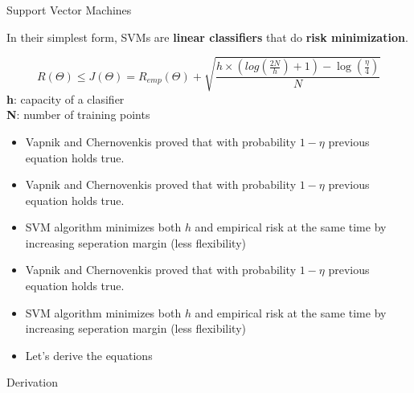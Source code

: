 \documentclass[12pt,fleqn]{article}\usepackage{../common}
\begin{document}
Support Vector Machines

In their simplest form, SVMs are \textbf{linear classifiers} that do
\textbf{risk minimization}.

\begin{equation}
R(\Theta) \leq J(\Theta) = R_{emp}(\Theta) +
\sqrt{ \frac{h \times (log(\frac{2N}{h}) + 1) - \log(\frac{\eta}{4})}{N}} \nonumber
\end{equation}
\textbf{h}: capacity of a clasifier \\
\textbf{N}: number of training points 

\begin{itemize}
   \item Vapnik and Chernovenkis proved that with probability $1-\eta$ previous
equation holds true.
\end{itemize}

\begin{itemize}
   \item Vapnik and Chernovenkis proved that with probability $1-\eta$ previous
equation holds true.
   \item SVM algorithm minimizes both $h$ and empirical risk at the same time by
   increasing seperation margin (less flexibility)
\end{itemize}

\begin{itemize}
   \item Vapnik and Chernovenkis proved that with probability $1-\eta$ previous
equation holds true.
   \item SVM algorithm minimizes both $h$ and empirical risk at the same time by
   increasing seperation margin (less flexibility)
   \item Let's derive the equations
\end{itemize}

Derivation

\begin{figure}[!hbp]
\caption{}
\end{figure}
\end{document}
